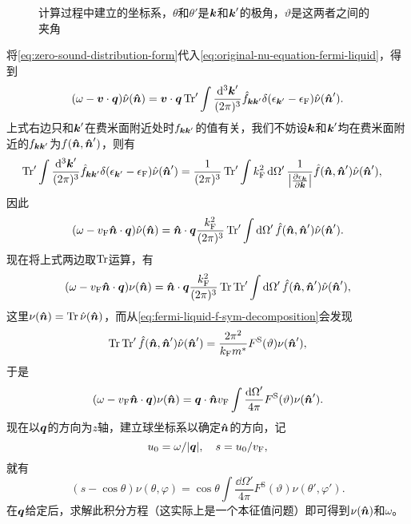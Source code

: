 \begin{figure}
    \centering
    
    \caption{计算过程中建立的坐标系，$\theta$和$\theta'$是$\vb*{k}$和$\vb*{k}'$的极角，$\vartheta$是这两者之间的夹角}
\end{figure}

将\eqref{eq:zero-sound-distribution-form}代入\eqref{eq:original-nu-equation-fermi-liquid}，得到
\[
    (\omega - \vb*{v} \cdot \vb*{q}) \hat{\nu}(\vu*{n}) = \vb*{v} \cdot \vb*{q} \Trace' \int \frac{\dd[3]{\vb*{k}'}}{(2\pi)^3} \hat{f}_{\vb*{k} \vb*{k}'} \delta(\epsilon_{\vb*{k}'} - \epsilon_\text{F}) \hat{\nu}(\vu*{n}').
\]
上式右边只和$\vb*{k}'$在费米面附近处时$f_{\vb*{k} \vb*{k}'}$的值有关，我们不妨设$\vb*{k}$和$\vb*{k}'$均在费米面附近的$f_{\vb*{k} \vb*{k}'}$为$f(\vu*{n}, \vu*{n}')$，则有
\[
    \begin{aligned}
        \Trace' \int \frac{\dd[3]{\vb*{k}'}}{(2\pi)^3} \hat{f}_{\vb*{k} \vb*{k}'} \delta(\epsilon_{\vb*{k}'} - \epsilon_\text{F}) \hat{\nu}(\vu*{n}') &= \frac{1}{(2\pi)^3} \Trace' \int k_\text{F}^2 \dd{\Omega'} \frac{1}{\abs{\pdv{\epsilon_{\vb*{k}}}{\vb*{k}}}} \hat{f}(\vu*{n}, \vu*{n}') \hat{\nu}(\vu*{n}'),
    \end{aligned}
\]
因此
\[
    (\omega - v_\text{F} \vu*{n} \cdot \vb*{q}) \hat{\nu}(\vu*{n}) = \vu*{n} \cdot \vb*{q} \frac{k_\text{F}^2}{(2\pi)^3} \Trace' \int \dd{\Omega'} \hat{f}(\vu*{n}, \vu*{n}') \hat{\nu}(\vu*{n}').
\]
现在将上式两边取$\Trace$运算，有
\[
    (\omega - v_\text{F} \vu*{n} \cdot \vb*{q}) {\nu}(\vu*{n}) = \vu*{n} \cdot \vb*{q} \frac{k_\text{F}^2}{(2\pi)^3} \Trace \Trace' \int \dd{\Omega'} \hat{f}(\vu*{n}, \vu*{n}') \hat{\nu}(\vu*{n}'),
\]
这里$\nu(\vu*{n}) = \Trace \hat{\nu}(\vu*{n})$，而从\eqref{eq:fermi-liquid-f-sym-decomposition}会发现
\[
    \Trace \Trace' \hat{f}(\vu*{n}, \vu*{n}') \hat{\nu}(\vu*{n}') = \frac{2 \pi^2}{k_\text{F} m^*} F^\text{S}(\vartheta) \nu(\vu*{n}'),
\]
于是
\begin{equation}
    (\omega - v_\text{F} \vu*{n} \cdot \vb*{q}) {\nu}(\vu*{n}) = \vb*{q} \cdot \vu*{n} v_\text{F} \int \frac{\dd{\Omega}'}{4\pi} F^\text{S}(\vartheta) \nu(\vu*{n}').
\end{equation}
现在以$\vb*{q}$的方向为$z$轴，建立球坐标系以确定$\vu*{n}$的方向，记
\begin{equation}
    u_0 = \omega / \abs{\vb*{q}}, \quad s = u_0 / v_\text{F},
\end{equation}
就有
\begin{equation}
    (s - \cos \theta) \nu(\theta, \varphi) = \cos \theta \int \frac{\dd{\Omega'}}{4\pi} F^\text{S}(\vartheta) \nu(\theta', \varphi').
    \label{eq:fermi-liquid-nu-determine}
\end{equation}
在$\vb*{q}$给定后，求解此积分方程（这实际上是一个本征值问题）即可得到$\nu(\vu*{n})$和$\omega$。

